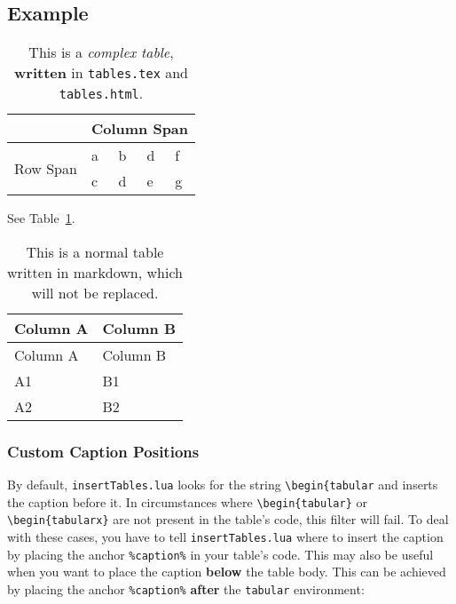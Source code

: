 \documentclass[
]{article}
\begin{document}
\hypertarget{example}{%
\subsection{Example}\label{example}}

\begin{table}[!htb]
    \centering
    \caption{\label{tbl:custom-table}This is a \emph{complex table}, \textbf{written} in \texttt{tables.tex} and \texttt{tables.html}.}
\begin{tabular}{lllll}
        \hline
        \textbf{} & \multicolumn{4}{l}{Column Span} \\ \hline
        \multirow{2}{*}{Row Span} & a & b & d & f \\
         & c & d & e & g \\ \hline
        \end{tabular}
\end{table}

See Table~\ref{tbl:custom-table}.

\hypertarget{tbl:normal-table}{}
\begin{longtable}[]{@{}ll@{}}
\caption{\label{tbl:normal-table}This is a normal table written in
markdown, which will not be replaced.}\tabularnewline
\toprule
Column A & Column B \\
\midrule
\endfirsthead
\toprule
Column A & Column B \\
\midrule
\endhead
A1 & B1 \\
A2 & B2 \\
\bottomrule
\end{longtable}

\hypertarget{custom-caption-positions}{%
\subsubsection{Custom Caption
Positions}\label{custom-caption-positions}}

By default, \texttt{insertTables.lua} looks for the string
\texttt{\textbackslash{}begin\{tabular} and inserts the caption before
it. In circumstances where \texttt{\textbackslash{}begin\{tabular\}} or
\texttt{\textbackslash{}begin\{tabularx\}} are not present in the
table's code, this filter will fail. To deal with these cases, you have
to tell \texttt{insertTables.lua} where to insert the caption by placing
the anchor \texttt{\%caption\%} in your table's code. This may also be
useful when you want to place the caption \textbf{below} the table body.
This can be achieved by placing the anchor \texttt{\%caption\%}
\textbf{after} the \texttt{tabular} environment:
\end{document}
